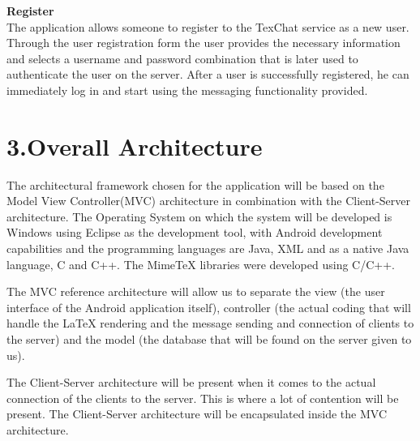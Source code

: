 \documentclass[29pt,a4paper]{moderncv}
\begin{document}
			\noindent\textbf{Register}
			\\The application allows someone to register to the TexChat service as a new user. Through the user registration form the user provides the necessary information and selects a username and password combination that is later used to authenticate the user on the server. After a user is successfully registered, he can immediately log in and start using the messaging functionality provided.
			
	\vspace{5mm}
	
\newpage	
	\section*{\textbf{3.Overall Architecture}}
	\vspace{4mm}
		\noindent The architectural framework chosen for the application will be based on the Model View Controller(MVC) architecture in combination with the Client-Server architecture. The Operating System on which the system will be developed is Windows using Eclipse as the development tool, with Android development capabilities and the programming languages are Java, XML and as a native Java language, C and C++. The MimeTeX libraries were developed using C/C++.
		
		\parindent 5mm The MVC reference architecture will allow us to separate the view (the user interface of the Android application itself),  controller (the actual coding that will handle the LaTeX rendering and the message sending and connection of clients to the server) and the model (the database that will be found on the server given to us).
		
		\parindent 5mm The Client-Server architecture will be present when it comes to the actual connection of the clients to the server. This is where a lot of contention will be present. The Client-Server architecture will be encapsulated inside the MVC architecture.\\
\end{document}
